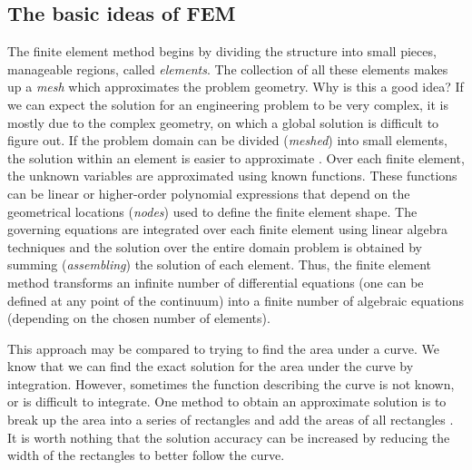 	\subsection{The basic ideas of FEM}
The finite element method begins by dividing the structure into small pieces, manageable regions, called \emph{elements}. The collection of all these elements makes up a \emph{mesh} which approximates the problem geometry. Why is this a good idea? If we can expect the solution for an engineering problem to be very complex, it is mostly due to the complex geometry, on which a global solution is difficult to figure out. If the problem domain can be divided (\emph{meshed}) into small elements, the solution within an element is easier to approximate \citep{MacDonald07}. Over each finite element, the unknown variables are approximated using known functions. These functions can be linear or higher-order polynomial expressions that depend on the geometrical locations (\emph{nodes}) used to define the finite element shape. The governing equations are integrated over each finite element using linear algebra techniques and the solution over the entire domain problem is obtained by summing (\emph{assembling}) the solution of each element. Thus, the finite element method transforms an infinite number of differential equations (one can be defined at any point of the continuum) into a finite number of algebraic equations (depending on the chosen number of elements). 

This approach may be compared to trying to find the area under a curve. We know that we can find the exact solution for the area under the curve by integration. However, sometimes the function describing the curve is not known, or is difficult to integrate. One method to obtain an approximate solution is to break up the area into a series of rectangles and add the areas of all rectangles . It is worth nothing that the solution accuracy can be increased by reducing the width of the rectangles to better follow the curve. 

\bigskip

